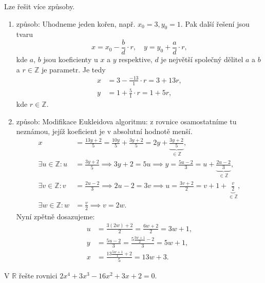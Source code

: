 \begin{reseni}
Lze řešit více způsoby.
\begin{enumerate}[1.]
\item způsob: Uhodneme jeden kořen, např. $x_0=3, y_0=1.$ Pak další řešení jsou tvaru
$$x=x_0-\frac{b}{d}\cdot r,\quad y=y_0+\frac{a}{d}\cdot r,$$ kde $a$, $b$ jsou koeficienty u $x$ a $y$ respektive, $d$ je největší společný dělitel $a$ a $b$ a $r \in \mathbb Z$ je parametr. Je tedy
\begin{align*}
    x&=3-\frac{-13}{1}\cdot r=3+13r, \\
    y &= 1+\frac{5}{1}\cdot r = 1+5r,
\end{align*}
kde $r\in \mathbb Z.$
\item způsob: Modifikace Eukleidova algoritmu: z rovnice osamostatníme tu neznámou,
jejíž koeficient je v absolutní hodnotě menší.
\begin{align*}
    x &= \frac{13y+2}{5}=\frac{10y}{5}+\frac{3y+2}{5}=2y+\underbrace{\frac{3y+2}{5}}_{\in \mathbb Z},\\
    \exists u \in \mathbb Z\colon u &= \frac{3y+2}{5}\implies 3y+2=5u \implies y=\frac{5u-2}{3}=u+\underbrace{\frac{2u-2}{3}}_{\in \mathbb Z}, \\
     \exists v \in \mathbb Z\colon v &= \frac{2u-2}{3} \implies 2u-2=3v \implies u = \frac{3v+2}{2} = v + 1 + \underbrace{\frac{v}{2}}_{\in \mathbb Z} ,\\
     \exists w \in \mathbb Z\colon w &= \frac{v}{2}\implies v = 2w.
\end{align*}
Nyní zpětně dosazujeme:
\begin{align*}
    u&= \frac{3(2w)+2}{2}=\frac{6w+2}{2}=3w+1,\\
    y&=\frac{5u-2}{3}=\frac{5 \frac{3w+1}{2}-2}{3}=5w+1, \\
    x &= \frac{13 \frac{5w+1}{1}+2}{5}=13w+3.
\end{align*}
\end{enumerate}
\end{reseni}

\begin{priklad}
V $\mathbb R$ řešte rovnici $2x^4+3x^3-16x^2+3x+2=0.$
\end{priklad}

